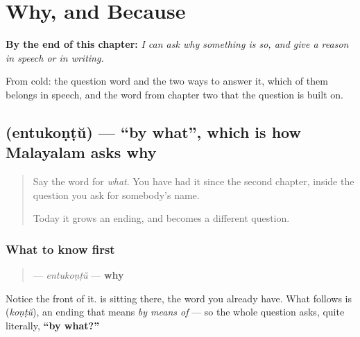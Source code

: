 
\chapter{Why, and Because}
\label{ch:ml-kaaranam}

\begin{chapteropening}
\textbf{By the end of this chapter:} \emph{I can ask why something is so, and give a reason in speech or in writing.}

From cold: the question word and the two ways to answer it, which of them belongs in speech, and the word from chapter two that the question is built on.
\end{chapteropening}

\section[\texorpdfstring{\ml{എന്തുകൊണ്ട്} (entukoṇṭŭ)}{എന്തുകൊണ്ട് (entukoṇṭŭ)}]{ (entukoṇṭŭ) — \textquotedblleft{}by what\textquotedblright{}, which is how Malayalam asks why}

\label{lesson:ML-C73-enthukondu}



\begin{quote}
Say the word for \emph{what}. You have had it since the second chapter, inside the question you ask for somebody's name.

Today it grows an ending, and becomes a different question.
\end{quote}

\subsection*{What to know first}
\begin{quote}
\textbf{} — \emph{entukoṇṭŭ} — \textbf{why}
\end{quote}

Notice the front of it. \textbf{} is sitting there, the word you already have. What follows is \textbf{} (\emph{koṇṭŭ}), an ending that means \emph{by means of} — so the whole question asks, quite literally, \textbf{\textquotedblleft{}by what?\textquotedblright{}}

